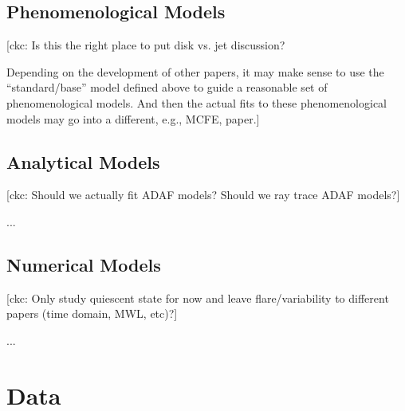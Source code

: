 \documentclass[twocolumn,tighten,dvipsnames]{aastex63}
\newcommand\<{{\langle}}
\renewcommand\>{{\rangle}} %
\newcommand\ckc[1]{{\color{MidnightBlue}[ckc: #1]}}
\begin{document}
\subsection{Phenomenological Models}
\label{sec:phenomodels}

\ckc{Is this the right place to put disk vs. jet discussion?

  Depending on the development of other papers, it may make sense
  to use the ``standard/base'' model defined above to guide a
  reasonable set of phenomenological models.
  And then the actual fits to these phenomenological models may go
  into a different, e.g., MCFE, paper.}

\subsection{Analytical Models}
\label{sec:anamodels}

\ckc{Should we actually fit ADAF models?  Should we ray trace ADAF models?}

...

\subsection{Numerical Models}
\label{sec:numodels}

\ckc{Only study quiescent state for now and leave flare/variability to
  different papers (time domain, MWL, etc)?}


...

\section{Data}
\end{document}
